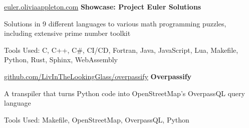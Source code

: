 	\vspace{0.2 cm}

	\begin{samepage}
		\begin{twocolentry}
			{ \href{https://euler.oliviaappleton.com}{euler.oliviaappleton.com} } \textbf{Showcase:
			Project Euler Solutions}
		\end{twocolentry}
	
		\begin{onecolentry}
			\begin{highlights}
				\item Solutions in 9 different languages to various math programming puzzles, including extensive prime number toolkit
				\item Tools Used: C, C+\!+, C\#, CI/CD, Fortran, Java, JavaScript, Lua,
				Makefile, Python, Rust, Sphinx, WebAssembly
			\end{highlights}
		\end{onecolentry}
	\end{samepage}

	\vspace{0.2 cm}

	\begin{samepage}
		\begin{twocolentry}
			{ \href{https://github.com/LivInTheLookingGlass/overpassify}{\hspace{-3 cm} \mbox{github.com/LivInTheLookingGlass/overpassify}} } \textbf{Overpassify}
		\end{twocolentry}
	
		\begin{onecolentry}
			\begin{highlights}
				\item A transpiler that turns Python code into OpenStreetMap's OverpassQL query language
				\item Tools Used: Makefile, OpenStreetMap, OverpassQL, Python
			\end{highlights}
		\end{onecolentry}
	\end{samepage}

	\vspace{0.2 cm}

